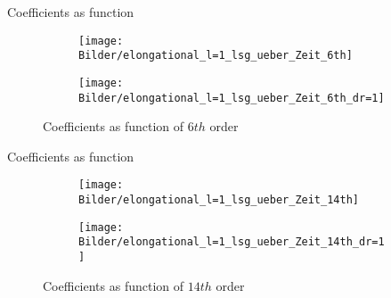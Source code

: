 \begin{frame}{Coefficients as function}
	\begin{figure}
		\begin{subfigure}{0.48\textwidth}
			\texttt{[image: Bilder/elongational\_l=1\_lsg\_ueber\_Zeit\_6th]}
		\end{subfigure}
		\hfill
		\begin{subfigure}{0.48\textwidth}
			\texttt{[image: Bilder/elongational\_l=1\_lsg\_ueber\_Zeit\_6th\_dr=1]}
		\end{subfigure}
		\caption{Coefficients as function of $6th$ order}
	\end{figure}
\end{frame}


\begin{frame}{Coefficients as function}
	\begin{figure}
		\begin{subfigure}{0.48\textwidth}
			\texttt{[image: Bilder/elongational\_l=1\_lsg\_ueber\_Zeit\_14th]}
		\end{subfigure}
		\hfill
		\begin{subfigure}{0.48\textwidth}
			\texttt{[image: Bilder/elongational\_l=1\_lsg\_ueber\_Zeit\_14th\_dr=1]}
		\end{subfigure}
		\caption{Coefficients as function of $14th$ order}
	\end{figure}
\end{frame}






